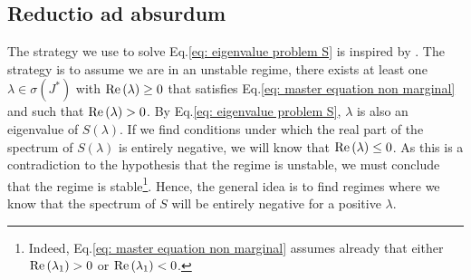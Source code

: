 \documentclass[12pt, titlepage]{report}
\begin{document}
\subsection{Reductio ad absurdum} \label{subsubsec: reductio ad absurdum}
The strategy we use to solve Eq.\eqref{eq: eigenvalue problem S} is inspired by \cite{butler_stability_2018}. The strategy is to assume we are in an unstable regime, \ie there exists at least one $\lambda \in \sigma(J^*)$ with $\text{Re}\left(\lambda\right)\geq 0$ that satisfies Eq.\eqref{eq: master equation non marginal} and such that $\text{Re}\left(\lambda\right) > 0$. By Eq.\eqref{eq: eigenvalue problem S}, $\lambda$ is also an eigenvalue of $S(\lambda)$. If we find conditions under which the real part of the spectrum of $S(\lambda)$ is entirely negative, we will know that $\text{Re}\left(\lambda\right) \leq 0$. As this is a contradiction to the hypothesis that the regime is unstable, we must conclude that the regime is stable\footnote{Indeed, Eq.\eqref{eq: master equation non marginal} assumes already that either $\text{Re}\left(\lambda_1\right) >0$ or $\text{Re}\left(\lambda_1\right) < 0$.}.
Hence, the general idea is to find regimes where we know that the spectrum of $S$ %
will be entirely negative for a positive $\lambda$. %
\end{document}
